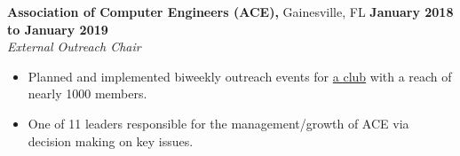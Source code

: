 \noindent\textbf{Association of Computer Engineers (ACE),} Gainesville, FL \hfill\textbf{January 2018 to January 2019}\\
\textit{External Outreach Chair}
\begin{itemize}[noitemsep,nolistsep, label={-}]
	\item Planned and implemented biweekly outreach events for \href{https://uf-ace.com/}{a club} with a reach of nearly 1000 members.
	\item One of 11 leaders responsible for the management/growth of ACE via decision making on key issues.
\end{itemize}
\subsectionspace